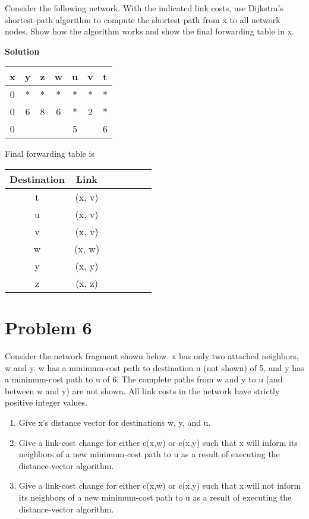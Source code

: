 \documentclass[12pt,letterpaper]{ctexart}
\begin{document}
Consider the following network. With the indicated link costs, use Dijkstra’s shortest-path
algorithm to compute the shortest path from x to all network nodes. Show how the algorithm
works and show the final forwarding table in x.

{\bf Solution}

\begin{table}[htbp]
  \small
  \centering
  \begin{tabular}{|c|c|c|c|c|c|c|}
  \hline
   x & y & z & w & u & v & t \\ \hline
   0 & * & * & * & * & * & * \\ \hline
   0 & 6 & 8 & 6 & * & 2 & * \\ \hline
   0 &   &   &   & 5 &   & 6 \\ \hline
  \end{tabular}
\end{table}

Final forwarding table is

\begin{table}[htbp]
  \small
  \centering
  \begin{tabular}{|c|c|c|c|c|c|c|}
  \hline
  Destination & Link \\ \hline
       t      &  (x, v)  \\ \hline
       u      &  (x, v)  \\ \hline
       v      &  (x, v)  \\ \hline
       w      &  (x, w)  \\ \hline
       y      &  (x, y)  \\ \hline
       z      &  (x, z)  \\ \hline
  \end{tabular}
\end{table}


\section*{Problem 6}
Consider the network fragment shown below. x has only two attached neighbors, w and y. w
has a minimum-cost path to destination u (not shown) of 5, and y has a minimum-cost path to u
of 6. The complete paths from w and y to u (and between w and y) are not shown. All link costs
in the network have strictly positive integer values.
\begin{enumerate}
  \item Give x’s distance vector for destinations w, y, and u.
  \item Give a link-cost change for either c(x,w) or c(x,y) such that x will inform its neighbors of a new
  minimum-cost path to u as a result of executing the distance-vector algorithm.
  \item Give a link-cost change for either c(x,w) or c(x,y) such that x will not inform its neighbors of a
  new minimum-cost path to u as a result of executing the distance-vector algorithm.
\end{enumerate}
\end{document}
